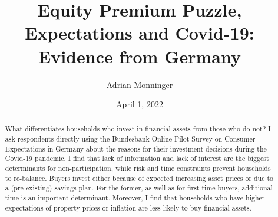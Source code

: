 \documentclass[ProjectABM]{subfiles}
\begin{document}
\providecommand{\versn}{pdf} %
\ifthenelse{\boolean{Web}}{    %
  \renewcommand{\versn}{Web}     %
  \renewcommand{\rootFromOut}{.} %
}{}  %


\title{Equity Premium Puzzle, Expectations and Covid-19:\\ Evidence from Germany}

\author{Adrian Monninger\authNum}




\renewcommand{\forcedate}{April 1, 2022}\date{\forcedate}

\maketitle
\hypertarget{abstract}{}
\begin{abstract}
	What differentiates households who invest in financial assets from those who do not? I ask respondents directly using the Bundesbank Online Pilot Survey on Consumer Expectations in Germany about the reasons for their investment decisions during the Covid-19 pandemic. I find that lack of information and lack of interest are the biggest determinants for non-participation, while risk and time constraints prevent households to re-balance. Buyers invest either because of expected increasing asset prices or due to a (pre-existing) savings plan. For the former, as well as for first time buyers, additional time is an important determinant. Moreover, I find that households who have higher expectations of property prices or inflation are less likely to buy financial assets.
\end{abstract}
\end{document}
